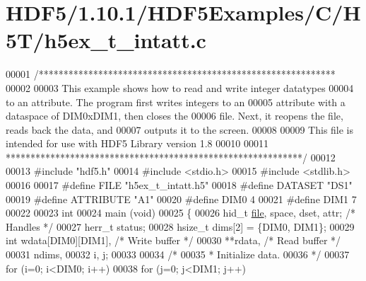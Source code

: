 \hypertarget{_h_d_f5_21_810_81_2_h_d_f5_examples_2_c_2_h5_t_2h5ex__t__intatt_8c_source}{}\section{H\+D\+F5/1.10.1/\+H\+D\+F5\+Examples/\+C/\+H5\+T/h5ex\+\_\+t\+\_\+intatt.c}
\label{_h_d_f5_21_810_81_2_h_d_f5_examples_2_c_2_h5_t_2h5ex__t__intatt_8c_source}

\begin{DoxyCode}
00001 \textcolor{comment}{/************************************************************}
00002 \textcolor{comment}{}
00003 \textcolor{comment}{  This example shows how to read and write integer datatypes}
00004 \textcolor{comment}{  to an attribute.  The program first writes integers to an}
00005 \textcolor{comment}{  attribute with a dataspace of DIM0xDIM1, then closes the}
00006 \textcolor{comment}{  file.  Next, it reopens the file, reads back the data, and}
00007 \textcolor{comment}{  outputs it to the screen.}
00008 \textcolor{comment}{}
00009 \textcolor{comment}{  This file is intended for use with HDF5 Library version 1.8}
00010 \textcolor{comment}{}
00011 \textcolor{comment}{ ************************************************************/}
00012 
00013 \textcolor{preprocessor}{#include "hdf5.h"}
00014 \textcolor{preprocessor}{#include <stdio.h>}
00015 \textcolor{preprocessor}{#include <stdlib.h>}
00016 
00017 \textcolor{preprocessor}{#define FILE            "h5ex\_t\_intatt.h5"}
00018 \textcolor{preprocessor}{#define DATASET         "DS1"}
00019 \textcolor{preprocessor}{#define ATTRIBUTE       "A1"}
00020 \textcolor{preprocessor}{#define DIM0            4}
00021 \textcolor{preprocessor}{#define DIM1            7}
00022 
00023 \textcolor{keywordtype}{int}
00024 main (\textcolor{keywordtype}{void})
00025 \{
00026     hid\_t       \hyperlink{structfile}{file}, space, dset, attr;            \textcolor{comment}{/* Handles */}
00027     herr\_t      status;
00028     hsize\_t     dims[2] = \{DIM0, DIM1\};
00029     \textcolor{keywordtype}{int}         wdata[DIM0][DIM1],                  \textcolor{comment}{/* Write buffer */}
00030                 **rdata,                            \textcolor{comment}{/* Read buffer */}
00031                 ndims,
00032                 i, j;
00033 
00034     \textcolor{comment}{/*}
00035 \textcolor{comment}{     * Initialize data.}
00036 \textcolor{comment}{     */}
00037     \textcolor{keywordflow}{for} (i=0; i<DIM0; i++)
00038         \textcolor{keywordflow}{for} (j=0; j<DIM1; j++)

\end{DoxyCode}
